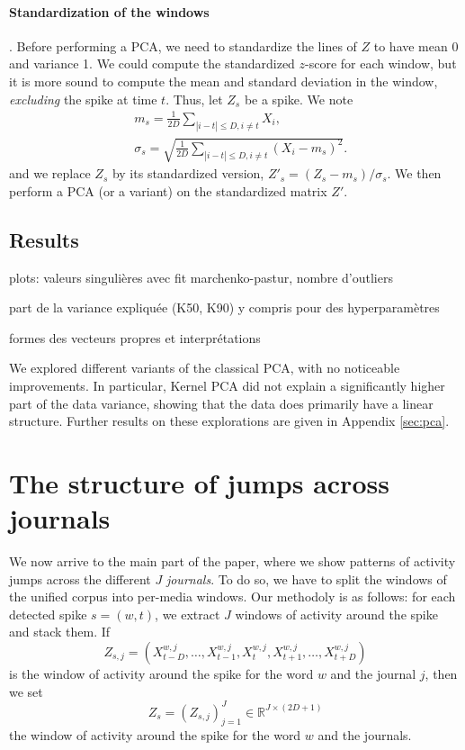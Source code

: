 \documentclass[11pt,a4paper]{article}
\begin{document}
\paragraph{Standardization of the windows}. Before performing a PCA, we need to standardize the lines of $Z$ to have mean 0 and variance 1. We could compute the standardized $z$-score for each window, but it is more sound to compute the mean and standard deviation in the window, \emph{excluding} the spike at time $t$. Thus, let $Z_s$ be a spike. We note 
\begin{align*}
  &m_s = \frac{1}{2D} \sum_{| i - t | \leq D, i \neq t} X_i, \\
  &\sigma_s = \sqrt{\frac{1}{2D} \sum_{| i - t | \leq D, i \neq t} (X_i - m_s)^2}.
\end{align*}
and we replace $Z_s$ by its standardized version, $Z'_s = (Z_s - m_s) / \sigma_s$. We then perform a PCA (or a variant) on the standardized matrix $Z'$.

\subsection{Results}

plots: valeurs singulières avec fit marchenko-pastur, nombre d'outliers 

part de la variance expliquée (K50, K90) y compris pour des hyperparamètres 

formes des vecteurs propres et interprétations

\begin{remark}
We explored different variants of the classical PCA, with no noticeable improvements. In particular, Kernel PCA did not explain a significantly higher part of the data variance, showing that the data does primarily have a linear structure. Further results on these explorations are given in Appendix \ref{sec:pca}.
\end{remark}


\section{The structure of jumps across journals}
\label{sec:journals}

We now arrive to the main part of the paper, where we show patterns of activity jumps across the different $J$ \emph{journals}. To do so, we have to split the windows of the unified corpus into per-media windows. Our methodoly is as follows: for each detected spike $s=(w,t)$, we extract $J$ windows of activity around the spike and stack them. If 
$$Z_{s,j} = (X_{t-D}^{w,j}, \dots, X_{t-1}^{w,j}, X_t^{w,j}, X_{t+1}^{w,j}, \dots, X_{t+D}^{w,j})$$
is the window of activity around the spike for the word $w$ and the journal $j$, then we set 
$$Z_s = (Z_{s,j})_{j = 1}^J \in \mathbb{R}^{J \times (2D+1)}$$
the window of activity around the spike for the word $w$ and the journals. 
\end{document}
